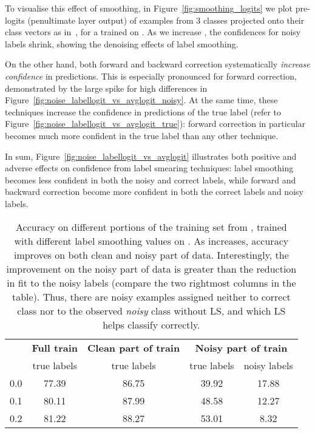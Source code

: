 To visualise this effect of smoothing, in Figure~\ref{fig:smoothing_logits} we plot pre-logits (penultimate layer output) of examples from 3 classes projected onto their class vectors as in~\citet{Muller:2019}, for a \resnetT{} trained on \cifarH{}.
As we increase , the confidences for noisy labels shrink, showing the denoising effects of label smoothing.

On the other hand, both forward and backward correction systematically \emph{increase confidence} in predictions.
This is especially pronounced for forward correction, demonstrated by the large spike for high differences in Figure~\ref{fig:noise_labellogit_vs_avglogit_noisy}.
At the same time, these techniques increase the confidence in predictions of the true label 
(refer to Figure~\ref{fig:noise_labellogit_vs_avglogit_true}):
forward correction in particular
becomes much more confident in the true label than any other technique.

In sum,
Figure~\ref{fig:noise_labellogit_vs_avglogit} illustrates both positive and adverse effects on confidence from label smearing techniques:
label smoothing becomes less confident in both the noisy and correct labels,
while forward and backward correction become more confident in both the correct labels and noisy labels. 


\begin{table}[!t]
    \centering
    
{
    \begin{tabular}{@{}lcccc@{}}
        \toprule
        \multicolumn{1}{c}{\textbf{}} & \multicolumn{1}{c}{\textbf{Full train}} & \textbf{Clean part of train} & \multicolumn{2}{c}{\textbf{Noisy part of train}}\\
         & true labels & true labels & true labels & noisy labels\\
        
        \toprule
        0.0 & 77.39 & 86.75 & 39.92 & 17.88 \\ 
        0.1 & 80.11 & 87.99 & 48.58 & 12.27\\
        0.2 & 81.22 & 88.27 & 53.01 & 8.32\\
        \bottomrule
    \end{tabular}
    }
    
\caption{Accuracy on different portions of the training set from \resnetT{}, trained with different label smoothing values  on \cifarH{}. As  increases, accuracy improves on both clean and noisy part of data. Interestingly, the improvement on the noisy part of data is greater than the reduction in fit to the noisy labels (compare the two rightmost columns in the table). Thus, there are noisy examples assigned neither to correct class nor to the observed \emph{noisy} class without LS, and which LS helps classify correctly.}
    \label{tbl:acc_on_different_portions_of_train}
\end{table}

